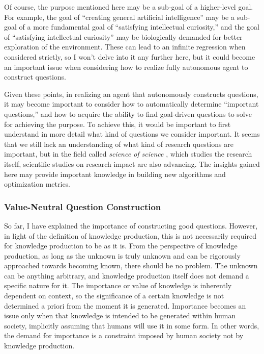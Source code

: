\documentclass{book}
\begin{document}
Of course, the purpose mentioned here may be a sub-goal of a higher-level goal. For example, the goal of ``creating general artificial intelligence'' may be a sub-goal of a more fundamental goal of ``satisfying intellectual curiosity,'' and the goal of ``satisfying intellectual curiosity'' may be biologically demanded for better exploration of the environment. These can lead to an infinite regression when considered strictly, so I won't delve into it any further here, but it could become an important issue when considering how to realize fully autonomous agent to construct questions.

Given these points, in realizing an agent that autonomously constructs questions, it may become important to consider how to automatically determine ``important questions,'' and how to acquire the ability to find goal-driven questions to solve for achieving the purpose. To achieve this, it would be important to first understand in more detail what kind of questions we consider important. It seems that we still lack an understanding of what kind of research questions are important, but in the field called \textit{science of science} \cite{wang2021}, which studies the research itself, scientific studies on research impact are also advancing. The insights gained here may provide important knowledge in building new algorithms and optimization metrics.

\subsubsection{Value-Neutral Question Construction}

So far, I have explained the importance of constructing good questions. However, in light of the definition of knowledge production, this is not necessarily required for knowledge production to be as it is. From the perspective of knowledge production, as long as the unknown is truly unknown and can be rigorously approached towards becoming known, there should be no problem. The unknown can be anything arbitrary, and knowledge production itself does not demand a specific nature for it. The importance or value of knowledge is inherently dependent on context, so the significance of a certain knowledge is not determined a priori from the moment it is generated. Importance becomes an issue only when that knowledge is intended to be generated within human society, implicitly assuming that humans will use it in some form. In other words, the demand for importance is a constraint imposed by human society not by knowledge production.
\end{document}
